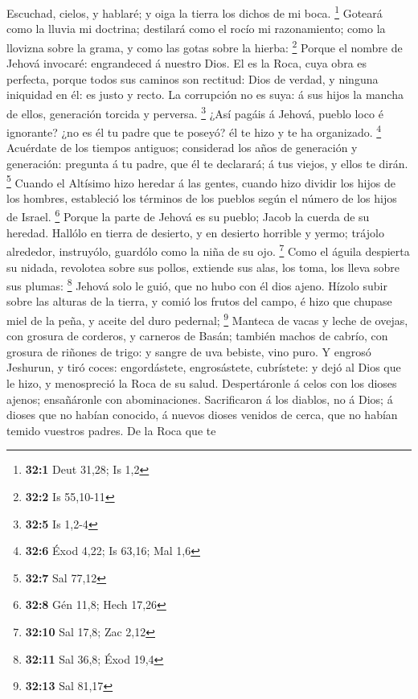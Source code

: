  Escuchad, cielos, y hablaré; y oiga la tierra los dichos
de mi boca. \footnote{\textbf{32:1} Deut 31,28; Is 1,2} 
Goteará como la lluvia mi doctrina; destilará como el rocío mi
razonamiento; como la llovizna sobre la grama, y como las gotas sobre la
hierba: \footnote{\textbf{32:2} Is 55,10-11}  Porque el
nombre de Jehová invocaré: engrandeced á nuestro Dios.  El
es la Roca, cuya obra es perfecta, porque todos sus caminos son
rectitud: Dios de verdad, y ninguna iniquidad en él: es justo y recto.
 La corrupción no es suya: á sus hijos la mancha de ellos,
generación torcida y perversa. \footnote{\textbf{32:5} Is 1,2-4}
 ¿Así pagáis á Jehová, pueblo loco é ignorante? ¿no es él
tu padre que te poseyó? él te hizo y te ha organizado. \footnote{\textbf{32:6}
  Éxod 4,22; Is 63,16; Mal 1,6}  Acuérdate de los tiempos
antiguos; considerad los años de generación y generación: pregunta á tu
padre, que él te declarará; á tus viejos, y ellos te dirán. \footnote{\textbf{32:7}
  Sal 77,12}  Cuando el Altísimo hizo heredar á las
gentes, cuando hizo dividir los hijos de los hombres, estableció los
términos de los pueblos según el número de los hijos de Israel.
\footnote{\textbf{32:8} Gén 11,8; Hech 17,26}  Porque la
parte de Jehová es su pueblo; Jacob la cuerda de su heredad.
 Hallólo en tierra de desierto, y en desierto horrible y
yermo; trájolo alrededor, instruyólo, guardólo como la niña de su ojo.
\footnote{\textbf{32:10} Sal 17,8; Zac 2,12}  Como el
águila despierta su nidada, revolotea sobre sus pollos, extiende sus
alas, los toma, los lleva sobre sus plumas: \footnote{\textbf{32:11} Sal
  36,8; Éxod 19,4}  Jehová solo le guió, que no hubo con
él dios ajeno.  Hízolo subir sobre las alturas de la
tierra, y comió los frutos del campo, é hizo que chupase miel de la
peña, y aceite del duro pedernal; \footnote{\textbf{32:13} Sal 81,17}
 Manteca de vacas y leche de ovejas, con grosura de
corderos, y carneros de Basán; también machos de cabrío, con grosura de
riñones de trigo: y sangre de uva bebiste, vino puro.  Y
engrosó Jeshurun, y tiró coces: engordástete, engrosástete, cubrístete:
y dejó al Dios que le hizo, y menospreció la Roca de su salud.
 Despertáronle á celos con los dioses ajenos; ensañáronle
con abominaciones.  Sacrificaron á los diablos, no á
Dios; á dioses que no habían conocido, á nuevos dioses venidos de cerca,
que no habían temido vuestros padres.  De la Roca que te
